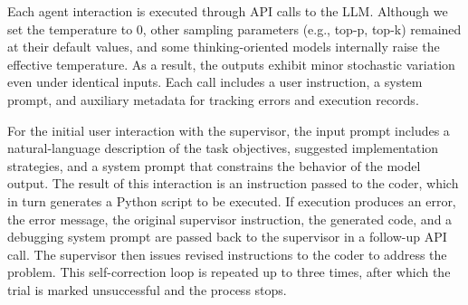\documentclass[aps,prd,reprint,superscriptaddress]{revtex4-2}
\begin{document}
Each agent interaction is executed through API calls to the LLM. Although we set the temperature to 0, other sampling parameters (e.g., top-p, top-k) remained at their default values, and some thinking-oriented models internally raise the effective temperature. As a result, the outputs exhibit minor stochastic variation even under identical inputs. Each call includes a user instruction, a system prompt, and auxiliary metadata for tracking errors and execution records.

For the initial user interaction with the supervisor, the input prompt includes a natural-language description of the task objectives, suggested implementation strategies, and a system prompt that constrains the behavior of the model output. The result of this interaction is an instruction passed to the coder, which in turn generates a Python script to be executed. If execution produces an error, the error message, the original supervisor instruction, the generated code, and a debugging system prompt are passed back to the supervisor in a follow-up API call. The supervisor then issues revised instructions to the coder to address the problem. This self-correction loop is repeated up to three times, after which the trial is marked unsuccessful and the process stops.
\end{document}
